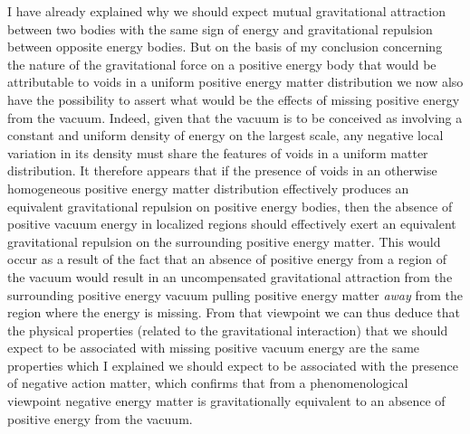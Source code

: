 \documentclass[notitlepage,12pt]{report}
\begin{document}
I have already explained why we should expect mutual gravitational attraction between two bodies with the same sign of energy and gravitational repulsion between opposite energy bodies. But on the basis of my conclusion concerning the nature of the gravitational force on a positive energy body that would be attributable to voids in a uniform positive energy matter distribution we now also have the possibility to assert what would be the effects of missing positive energy from the vacuum. Indeed, given that the vacuum is to be conceived as involving a constant and uniform density of energy on the largest scale, any negative local variation in its density must share the features of voids in a uniform matter distribution. It therefore appears that if the presence of voids in an otherwise homogeneous positive energy matter distribution effectively produces an equivalent gravitational repulsion on positive energy bodies, then the absence of positive vacuum energy in localized regions should effectively exert an equivalent gravitational repulsion on the surrounding positive energy matter. This would occur as a result of the fact that an absence of positive energy from a region of the vacuum would result in an uncompensated gravitational attraction from the surrounding positive energy vacuum pulling positive energy matter \textit{away} from the region where the energy is missing. From that viewpoint we can thus deduce that the physical properties (related to the gravitational interaction) that we should expect to be associated with missing positive vacuum energy are the same properties which I explained we should expect to be associated with the presence of negative action matter, which confirms that from a phenomenological viewpoint negative energy matter is gravitationally equivalent to an absence of positive energy from the vacuum.
\end{document}

